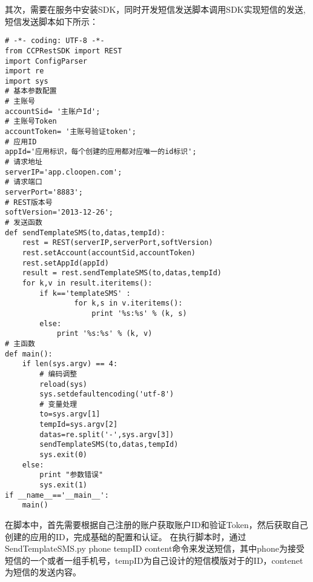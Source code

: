 其次，需要在服务中安装SDK，同时开发短信发送脚本调用SDK实现短信的发送,短信发送脚本如下所示：

\begin{lstlisting}[numbers=none]
# -*- coding: UTF-8 -*-
from CCPRestSDK import REST
import ConfigParser
import re
import sys
# 基本参数配置
# 主账号
accountSid= '主账户Id';
# 主账号Token
accountToken= '主账号验证token';
# 应用ID
appId='应用标识，每个创建的应用都对应唯一的id标识';
# 请求地址
serverIP='app.cloopen.com';
# 请求端口
serverPort='8883';
# REST版本号
softVersion='2013-12-26';
# 发送函数
def sendTemplateSMS(to,datas,tempId):
    rest = REST(serverIP,serverPort,softVersion)
    rest.setAccount(accountSid,accountToken)
    rest.setAppId(appId)
    result = rest.sendTemplateSMS(to,datas,tempId)
    for k,v in result.iteritems():
        if k=='templateSMS' :
                for k,s in v.iteritems():
                    print '%s:%s' % (k, s)
        else:
            print '%s:%s' % (k, v)
# 主函数
def main():
    if len(sys.argv) == 4:
        # 编码调整
        reload(sys)
        sys.setdefaultencoding('utf-8')
        # 变量处理
        to=sys.argv[1]
        tempId=sys.argv[2]
        datas=re.split('-',sys.argv[3])
        sendTemplateSMS(to,datas,tempId)
        sys.exit(0)
    else:
        print "参数错误"
        sys.exit(1)
if __name__=='__main__':
    main()
\end{lstlisting}
在脚本中，首先需要根据自己注册的账户获取账户ID和验证Token，然后获取自己创建的应用的ID，完成基础的配置和认证。
在执行脚本时，通过SendTemplateSMS.py phone tempID content命令来发送短信，其中phone为接受短信的一个或者一组手机号，tempID为自己设计的短信模版对于的ID，contenet为短信的发送内容。
